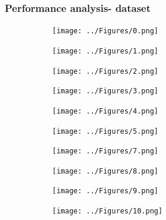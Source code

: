 \documentclass{beamer}
\theoremstyle{remark}
\theoremstyle{plain}
\begin{document}
\begin{frame}
	\frametitle{Performance analysis- dataset}
	
	\begin{figure}[!t]
		\centering
		\begin{subfigure}[t]{0.13\textwidth}
			\texttt{[image: ../Figures/0.png]}
			\caption{}
			\label{fig:masterchefcan}
		\end{subfigure}
		\begin{subfigure}[t]{0.13\textwidth}
			\texttt{[image: ../Figures/1.png]}
			\caption{}
			\label{fig:crackerbox}
		\end{subfigure}
		\begin{subfigure}[t]{0.13\textwidth}
			\texttt{[image: ../Figures/2.png]}
			\caption{}
			\label{fig:sugarbox}
		\end{subfigure}
		\begin{subfigure}[t]{0.13\textwidth}
			\texttt{[image: ../Figures/3.png]}
			\caption{}
			\label{fig:tomatosoupcan}
		\end{subfigure}
		\begin{subfigure}[t]{0.13\textwidth}
			\texttt{[image: ../Figures/4.png]}
			\caption{}
			\label{fig:mustardbottle}
		\end{subfigure}
		\begin{subfigure}[t]{0.13\textwidth}
			\texttt{[image: ../Figures/5.png]}
			\caption{}
			\label{fig:tunafishcan}
		\end{subfigure}
		\begin{subfigure}[t]{0.13\textwidth}
			\texttt{[image: ../Figures/7.png]}
			\caption{}
			\label{fig:gelatinbox}
		\end{subfigure}
		\centering
		\begin{subfigure}[t]{0.13\textwidth}
			\texttt{[image: ../Figures/8.png]}
			\caption{}
			\label{fig:pottedmeatcan}
		\end{subfigure}
		\begin{subfigure}[t]{0.13\textwidth}
			\texttt{[image: ../Figures/9.png]}
			\caption{}
			\label{fig:banana}
		\end{subfigure}
		\begin{subfigure}[t]{0.13\textwidth}
			\texttt{[image: ../Figures/10.png]}
			\caption{}
			\label{fig:strawberry}
		\end{subfigure}

\end{figure}
\end{frame}
\end{document}
